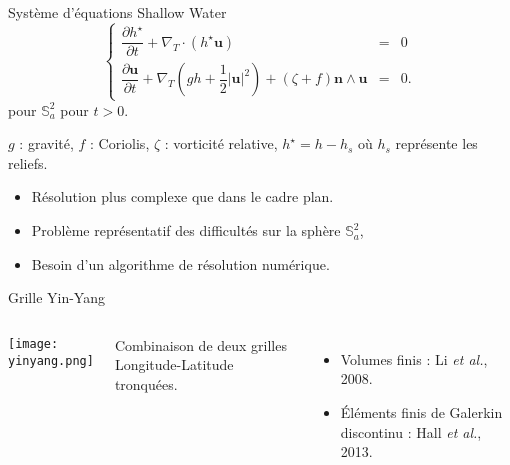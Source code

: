 \documentclass[11pt]{beamer}
\begin{document}
\begin{frame}{}
\begin{block}{Système d'équations Shallow Water}
\begin{equation*}
\left\lbrace
\begin{array}{rcl}
\dfrac{\partial h^{\star}}{\partial t} + \nabla_T \cdot \left( h^{\star} \mathbf{u} \right) & = & 0\\
\dfrac{\partial \mathbf{u}}{\partial t} + \nabla_T \left( gh + \dfrac{1}{2} |\mathbf{u}|^2 \right) + \left( \zeta + f \right) \mathbf{n} \wedge \mathbf{u} & = & 0.
\end{array}
\right.
\end{equation*}
pour $\mathbb{S}_a^2$ pour $t>0$.

$g$ : gravité, $f$ : Coriolis, $\zeta$ : vorticité relative, $h^{\star} = h - h_s$ où $h_s$ représente les reliefs.
\end{block}

\begin{itemize}
\item Résolution plus complexe que dans le cadre plan.
\item Problème représentatif des difficultés sur la sphère $\mathbb{S}_a^2$,
\item Besoin d'un algorithme de résolution numérique.
\end{itemize}
\end{frame}







\begin{frame}{Grille Yin-Yang}
\begin{columns}
\begin{center}
\texttt{[image: yinyang.png]}
\end{center}

Combinaison de deux grilles Longitude-Latitude tronquées.

\begin{itemize}
\item Volumes finis : Li \textit{et al.}, 2008.
\item Éléments finis de Galerkin discontinu : Hall \textit{et al.}, 2013.
\end{itemize}
\end{columns}
\end{frame}
\end{document}
